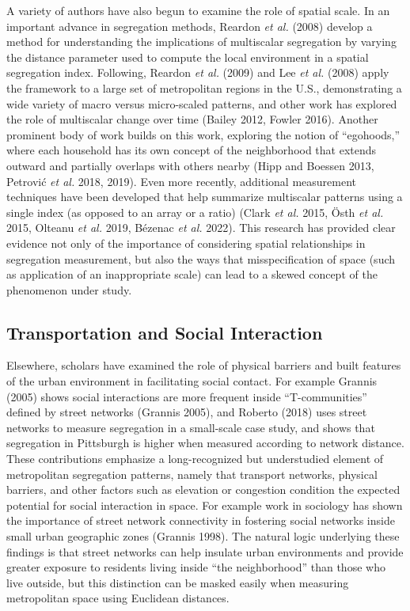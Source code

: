 \documentclass[
  10pt,
]{article}
\begin{document}
A variety of authors have also begun to examine the role of spatial
scale. In an important advance in segregation methods, Reardon \emph{et
al.} (2008) develop a method for understanding the implications of
multiscalar segregation by varying the distance parameter used to
compute the local environment in a spatial segregation index. Following,
Reardon \emph{et al.} (2009) and Lee \emph{et al.} (2008) apply the
framework to a large set of metropolitan regions in the U.S.,
demonstrating a wide variety of macro versus micro-scaled patterns, and
other work has explored the role of multiscalar change over time (Bailey
2012, Fowler 2016). Another prominent body of work builds on this work,
exploring the notion of ``egohoods,'' where each household has its own
concept of the neighborhood that extends outward and partially overlaps
with others nearby (Hipp and Boessen 2013, Petrović \emph{et al.} 2018,
2019). Even more recently, additional measurement techniques have been
developed that help summarize multiscalar patterns using a single index
(as opposed to an array or a ratio) (Clark \emph{et al.} 2015, Östh
\emph{et al.} 2015, Olteanu \emph{et al.} 2019, Bézenac \emph{et al.}
2022). This research has provided clear evidence not only of the
importance of considering spatial relationships in segregation
measurement, but also the ways that misspecification of space (such as
application of an inappropriate scale) can lead to a skewed concept of
the phenomenon under study.

\hypertarget{transportation-and-social-interaction}{%
\subsection{Transportation and Social
Interaction}\label{transportation-and-social-interaction}}

Elsewhere, scholars have examined the role of physical barriers and
built features of the urban environment in facilitating social contact.
For example Grannis (2005) shows social interactions are more frequent
inside ``T-communities'' defined by street networks (Grannis 2005), and
Roberto (2018) uses street networks to measure segregation in a
small-scale case study, and shows that segregation in Pittsburgh is
higher when measured according to network distance. These contributions
emphasize a long-recognized but understudied element of metropolitan
segregation patterns, namely that transport networks, physical barriers,
and other factors such as elevation or congestion condition the expected
potential for social interaction in space. For example work in sociology
has shown the importance of street network connectivity in fostering
social networks inside small urban geographic zones (Grannis 1998). The
natural logic underlying these findings is that street networks can help
insulate urban environments and provide greater exposure to residents
living inside ``the neighborhood'' than those who live outside, but this
distinction can be masked easily when measuring metropolitan space using
Euclidean distances.
\end{document}
